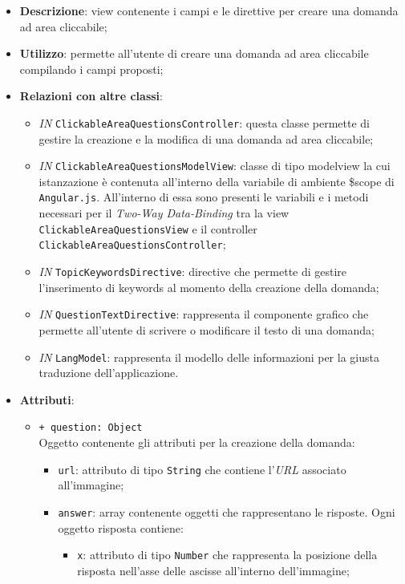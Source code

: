 \begin{itemize}
	\item \textbf{Descrizione}: view contenente i campi e le direttive per creare una domanda ad area cliccabile;
	\item \textbf{Utilizzo}:  permette all'utente di creare una domanda ad area cliccabile compilando i campi proposti;
	\item \textbf{Relazioni con altre classi}:
	\begin{itemize}
		\item \textit{IN} \texttt{ClickableAreaQuestionsController}: questa classe permette di gestire la creazione e la modifica di una domanda ad area cliccabile;
		\item \textit{IN} \texttt{ClickableAreaQuestionsModelView}: classe di tipo modelview la cui istanzazione è contenuta all'interno della variabile di ambiente \$scope di \texttt{Angular.js}. All'interno di essa sono presenti le variabili e i metodi necessari per il \textit{Two-Way Data-Binding} tra la view \texttt{ClickableAreaQuestionsView} e il controller \texttt{ClickableAreaQuestionsController};
		\item \textit{IN} \texttt{TopicKeywordsDirective}: directive che permette di gestire l'inserimento di keywords al momento della creazione della domanda;
		\item \textit{IN} \texttt{QuestionTextDirective}: rappresenta il componente grafico che permette all'utente di scrivere o modificare il testo di una domanda;
		\item \textit{IN} \texttt{LangModel}: rappresenta il modello delle informazioni per la giusta traduzione dell'applicazione.
	\end{itemize}
	\item \textbf{Attributi}:
	\begin{itemize}
		\item \texttt{+ question: Object} \\ Oggetto contenente gli attributi per la creazione della domanda:
		\begin{itemize}
			\item \texttt{url}: attributo di tipo \texttt{String} che contiene l'\textit{URL} associato all'immagine;
			\item \texttt{answer}: array contenente oggetti che rappresentano le risposte. Ogni oggetto risposta contiene:
			\begin{itemize}
				\item \texttt{x}: attributo di tipo \texttt{Number} che rappresenta la posizione della risposta nell'asse delle ascisse all'interno dell'immagine;

\end{itemize}
\end{itemize}
\end{itemize}
\end{itemize}
